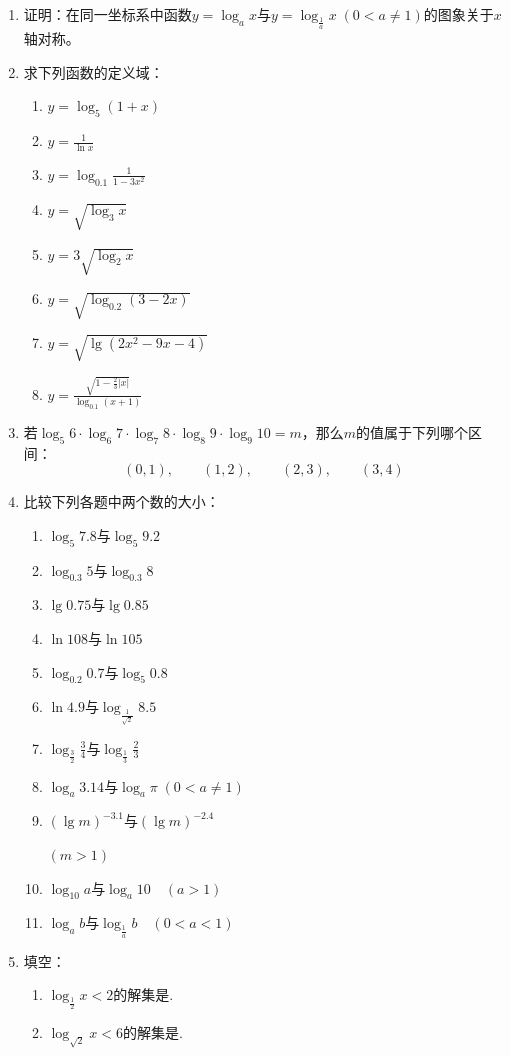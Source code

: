 \begin{enumerate}
    \item 证明：在同一坐标系中函数$y=\log_a x$与$y=\log_{\tfrac1a}x\; (0<a\neq1)$的图象关于$x$轴对称。
    \item 求下列函数的定义域：
\begin{multicols}{2}
\begin{enumerate}[(1)]
    \item $y=\log_5(1+x)$
    \item $y=\frac{1}{\ln x}$
    \item $y=\log_{0.1}\frac{1}{1-3x^2}$
    \item $y=\sqrt{\log_3 x}$
    \item $y=3\sqrt{\log_2 x}$
    \item $y=\sqrt{\log_{0.2}(3-2x)}$
    \item $y=\sqrt{\lg(2x^2-9x-4)}$
    \item $y=\frac{\sqrt{1-\frac{2}{3}|x|}}{\log_{0.1}(x+1)}$
\end{enumerate}
\end{multicols}

\item 若$\log_5 6\cdot \log_6 7\cdot \log_7 8\cdot \log_8 9\cdot \log_9 10=m$，那么$m$的值属于下列哪个区间：
\[(0,1),\qquad (1,2),\qquad (2,3),\qquad (3,4)\]
\item 比较下列各题中两个数的大小：
\begin{multicols}{2}
\begin{enumerate}[(1)]
    \item $\log_5 7.8$与$\log_5 9.2$
    \item $\log_{0.3}5$与$\log_{0.3}8$
    \item $\lg 0.75$与$\lg 0.85$
    \item $\ln108$与$\ln105$
    \item $\log_{0.2}0.7$与$\log_5 0.8$
    \item $\ln 4.9$与$\log_{\tfrac{1}{\sqrt{2}}}8.5$
    \item $\log_{\tfrac{3}{2}}\frac{3}{4}$与$\log_{\tfrac{1}{3}}\frac{2}{3}$
    \item $\log_a 3.14$与$\log_a \pi\; (0<a\ne 1)$
    \item $(\lg m)^{-3.1}$与$(\lg m)^{-2.4}$ 
    
    $(m>1)$
    \item $\log_{10}a$与$\log_a 10\quad (a>1)$
    \item $\log_a b$与$\log_{\tfrac{1}{a}}b\quad (0<a<1)$
\end{enumerate}
\end{multicols}
\item 填空：
\begin{enumerate}[(1)]
    \item $\log_{\tfrac{1}{2}}x<2$的解集是\blank.
    \item $\log_{\sqrt{2}}x<6$的解集是\blank.
    

\end{enumerate}
\end{enumerate}
